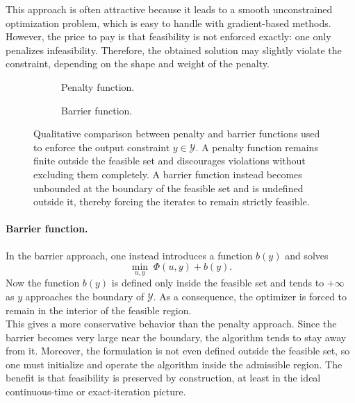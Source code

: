 This approach is often attractive because it leads to a smooth unconstrained optimization problem, which is easy to handle with gradient-based methods. However, the price to pay is that feasibility is not enforced exactly: one only penalizes infeasibility. Therefore, the obtained solution may slightly violate the constraint, depending on the shape and weight of the penalty.

\begin{figure}[!h]
    \centering
    \begin{subfigure}{0.45\textwidth}
        \centering
        
        \caption{Penalty function.}
    \end{subfigure}
    \hfill
    \begin{subfigure}{0.45\textwidth}
        \centering
        
        \caption{Barrier function.}
    \end{subfigure}
    \caption{Qualitative comparison between penalty and barrier functions used to enforce the output constraint $y \in \mathcal Y$. A penalty function remains finite outside the feasible set and discourages violations without excluding them completely. A barrier function instead becomes unbounded at the boundary of the feasible set and is undefined outside it, thereby forcing the iterates to remain strictly feasible.}
    \label{fig:penalty-barrier}
\end{figure}

\paragraph{Barrier function.}
In the barrier approach, one instead introduces a function $b(y)$ and solves
\[
\min_{u,y} \; \Phi(u,y) + b(y).
\]
Now the function $b(y)$ is defined only inside the feasible set and tends to $+\infty$ as $y$ approaches the boundary of $\mathcal Y$. As a consequence, the optimizer is forced to remain in the interior of the feasible region.\\

This gives a more conservative behavior than the penalty approach. Since the barrier becomes very large near the boundary, the algorithm tends to stay away from it. Moreover, the formulation is not even defined outside the feasible set, so one must initialize and operate the algorithm inside the admissible region. The benefit is that feasibility is preserved by construction, at least in the ideal continuous-time or exact-iteration picture.

